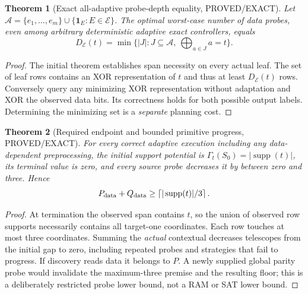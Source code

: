 \documentclass{article}
\newtheorem{theorem}{Theorem}
\begin{document}
\begin{theorem}[Exact all-adaptive probe-depth equality, PROVED/EXACT]
Let $\mathcal A=\{e_1,\ldots,e_m\}\cup\{\mathbf1_E:E\in\mathcal E\}$. The optimal worst-case number of data probes, even among arbitrary deterministic adaptive exact controllers, equals
\[
D_{\mathcal E}(t)=\min\{|J|:J\subseteq\mathcal A,\ \bigoplus_{a\in J}a=t\}.
\]
\end{theorem}
\begin{proof}
The initial theorem establishes span necessity on every actual leaf. The set of leaf rows contains an XOR representation of $t$ and thus at least $D_{\mathcal E}(t)$ rows. Conversely query any minimizing XOR representation without adaptation and XOR the observed data bits. Its correctness holds for both possible output labels. Determining the minimizing set is a \emph{separate} planning cost.
\end{proof}

\begin{theorem}[Required endpoint and bounded primitive progress, PROVED/EXACT]
For every correct adaptive execution including any data-dependent preprocessing, the initial support potential is $\Gamma_t(S_0)=|\operatorname{supp}(t)|$, its terminal value is zero, and every source probe decreases it by between zero and three. Hence
\[
P_{\rm data}+Q_{\rm data}\ge\left\lceil|\operatorname{supp}(t)|/3\right\rceil.
\]
\end{theorem}
\begin{proof}
At termination the observed span contains $t$, so the union of observed row supports necessarily contains all target-one coordinates. Each row touches at most three coordinates. Summing the \emph{actual} contextual decreases telescopes from the initial gap to zero, including repeated probes and strategies that fail to progress. If discovery reads data it belongs to $P$. A newly supplied global parity probe would invalidate the maximum-three premise and the resulting floor; this is a deliberately restricted probe lower bound, not a RAM or SAT lower bound.
\end{proof}
\end{document}
